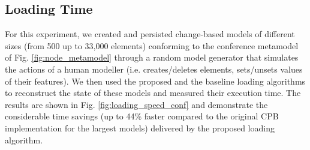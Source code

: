 \documentclass{llncs}
\begin{document}
\subsection{Loading Time}
\label{subsec:loading_time_test}

For this experiment, we created and persisted change-based models of different sizes (from 500 up to 33,000 elements) conforming to the conference metamodel of Fig. \ref{fig:node_metamodel} through a random model generator that simulates the actions of a human modeller (i.e. creates/deletes elements, sets/unsets values of their features). We then used the proposed and the baseline loading algorithms to reconstruct the state of these models and measured their execution time. The results are shown in Fig. \ref{fig:loading_speed_conf} and demonstrate the considerable time savings (up to 44\% faster compared to the original CPB implementation for the largest models) delivered by the proposed loading algorithm.
\end{document}
